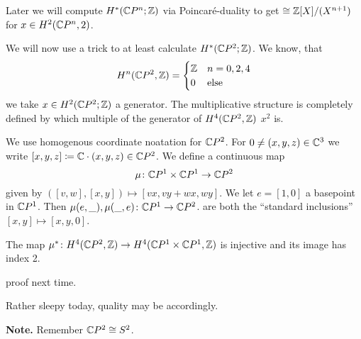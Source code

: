 \documentclass[language=english]{TemplateLecture}
\begin{document}
 Later we will compute \(H^*(\mathbb{C} P^n; \mathbb{Z})\) via Poincaré-duality to get \(\cong \mathbb{Z}[X]/(X^{n+1})\) for \(x \in H^2(\mathbb{C} P^n, 2)\).

 We will now use a trick to at least calculate \(H^*(\mathbb{C} P^2; \mathbb{Z})\). We know, that
 \[H^n(\mathbb{C} P^2, \mathbb{Z}) = \begin{cases}
    \mathbb{Z} & n = 0,2,4 \\
    0 & \text{else}
 \end{cases}\]
 we take \(x \in H^2(\mathbb{C} P^2; \mathbb{Z})\) a generator. The multiplicative structure is completely defined by which multiple of the generator of \(H^4(\mathbb{C} P^2, \mathbb{Z})\) \(x^2\) is.

We use homogenous coordinate noatation for \(\mathbb{C} P ^2\). For \(0 \neq (x,y,z) \in \mathbb{C}^3\) we write \([x,y,z] \coloneq \mathbb{C} \cdot (x,y,z) \in \mathbb{C} P ^2\). We define a continuous map
\[\mu\colon \mathbb{C} P ^1 \times \mathbb{C} P^1 \to \mathbb{C} P ^2\]
given by \(([v,w] , [x,y]) \mapsto [vx, vy+wx, wy]\).
We let \(e = [1,0]\) a basepoint in \(\mathbb{C} P^1\). Then \(\mu(e, \_), \mu(\_, e) \colon \mathbb{C} P ^1 \to \mathbb{C} P ^2\).
are both the \enquote{standard inclusions} \([x,y] \mapsto [x,y,0]\).

\begin{proposition}
    The map \(\mu^* \colon H^4(\mathbb{C} P^2, \mathbb{Z}) \to H^4(\mathbb{C} P^1 \times \mathbb{C} P^1, \mathbb{Z})\) is injective and its image has index 2.
\end{proposition}

proof next time.

 Rather sleepy today, quality may be accordingly.

\textbf{Note.} Remember \(\mathbb{C} P^2 \cong S^2\).
\end{document}
